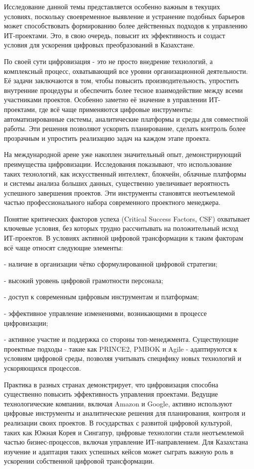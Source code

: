 Исследование данной темы представляется особенно важным в текущих
условиях, поскольку своевременное выявление и устранение подобных
барьеров может способствовать формированию более действенных подходов к
управлению ИТ-проектами. Это, в свою очередь, повысит их эффективность и
создаст условия для ускорения цифровых преобразований в Казахстане.

По своей сути цифровизация - это не просто внедрение технологий, а
комплексный процесс, охватывающий все уровни организационной
деятельности. Её задачи заключаются в том, чтобы повысить
производительность, упростить внутренние процедуры и обеспечить более
тесное взаимодействие между всеми участниками проектов. Особенно заметно
её значение в управлении ИТ-проектами, где всё чаще применяются цифровые
инструменты: автоматизированные системы, аналитические платформы и среды
для совместной работы. Эти решения позволяют ускорить планирование,
сделать контроль более прозрачным и упростить реализацию задач на каждом
этапе проекта.

На международной арене уже накоплен значительный опыт, демонстрирующий
преимущества цифровизации. Исследования показывают, что использование
таких технологий, как искусственный интеллект, блокчейн, облачные
платформы и системы анализа больших данных, существенно увеличивает
вероятность успешного завершения проектов. Эти инструменты становятся
неотъемлемой частью профессионального набора современного проектного
менеджера.

Понятие критических факторов успеха (Critical Success Factors, CSF)
охватывает ключевые условия, без которых трудно рассчитывать на
положительный исход ИТ-проектов. В условиях активной цифровой
трансформации к таким факторам всё чаще относят следующие элементы:


- наличие в организации чётко сформулированной цифровой стратегии;

- высокий уровень цифровой грамотности персонала;

- доступ к современным цифровым инструментам и платформам;

- эффективное управление изменениями, возникающими в процессе
цифровизации;

- активное участие и поддержка со стороны топ-менеджмента.
Существующие проектные подходы - такие как PRINCE2, PMBOK и Agile -
адаптируются к условиям цифровой среды, позволяя учитывать специфику
новых технологий и ускоряющихся процессов.

Практика в разных странах демонстрирует, что цифровизация способна
существенно повысить эффективность управления проектами. Ведущие
технологические компании, включая Amazon и Google, активно используют
цифровые инструменты и аналитические решения для планирования, контроля
и реализации своих проектов. В государствах с развитой цифровой
культурой, таких как Южная Корея и Сингапур, цифровые технологии стали
неотъемлемой частью бизнес-процессов, включая управление
ИТ-направлением. Для Казахстана изучение и адаптация таких успешных
кейсов может сыграть важную роль в ускорении собственной цифровой
трансформации.

